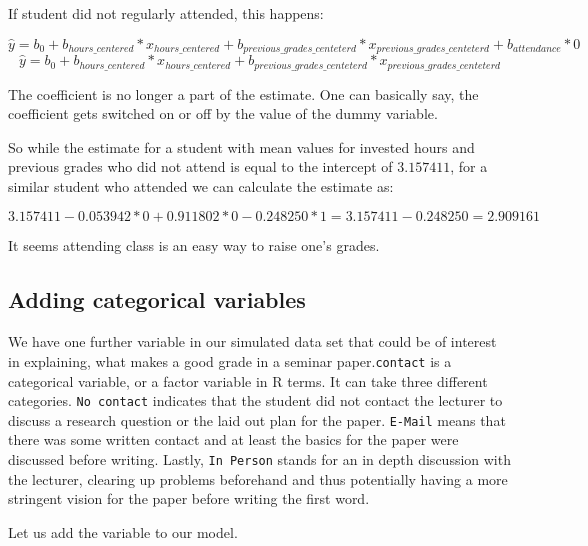\documentclass[
]{book}
\begin{document}
If student did not regularly attended, this happens:

\[\hat{y} = b_0 + b_{hours\_centered}*x_{hours\_centered} + b_{previous\_grades\_centeterd}*x_{previous\_grades\_centeterd} + b_{attendance} * 0\]
\[\hat{y} = b_0 + b_{hours\_centered}*x_{hours\_centered} + b_{previous\_grades\_centeterd}*x_{previous\_grades\_centeterd}\]

The coefficient is no longer a part of the estimate. One can basically say, the
coefficient gets switched on or off by the value of the dummy variable.

So while the estimate for a student with mean values for invested hours and
previous grades who did not attend is equal to the intercept of \(3.157411\),
for a similar student who attended we can calculate the estimate as:

\[3.157411 - 0.053942*0 + 0.911802*0 - 0.248250 * 1 = 3.157411 - 0.248250 = 2.909161\]

It seems attending class is an easy way to raise one's grades.

\hypertarget{adding-categorical-variables}{%
\subsection{Adding categorical variables}\label{adding-categorical-variables}}

We have one further variable in our simulated data set that could be of interest
in explaining, what makes a good grade in a seminar paper.\texttt{contact} is a
categorical variable, or a factor variable in R terms.
It can take three different categories. \texttt{No\ contact} indicates that
the student did not contact the lecturer to discuss a research question or the
laid out plan for the paper. \texttt{E-Mail} means that there was some written contact
and at least the basics for the paper were discussed before writing. Lastly,
\texttt{In\ Person} stands for an in depth discussion with the lecturer, clearing up
problems beforehand and thus potentially having a more stringent vision for the
paper before writing the first word.

Let us add the variable to our model.
\end{document}
